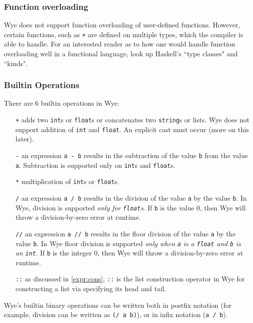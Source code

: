 \documentclass[a4paper, 12pt]{article}
\begin{document}
\subsubsection{Function overloading}
Wye does not support function overloading of user-defined functions. However, certain functions, such as \texttt{+} are defined on multiple types, which the compiler is able to handle. For an interested reader as to how one would handle function overloading well in a functional language, look up Haskell's ``type classes" and ``kinds".

\subsubsection{Builtin Operations}
There are 6 builtin operations in Wye:
\begin{itemize}
\item[\texttt{+}] adds two \texttt{int}s or \texttt{float}s or concatenates two \texttt{string}s or lists. Wye does not support addition of \texttt{int} and \texttt{float}. An explicit cast must occur (more on this later).
\item[\texttt{-}] an expression \texttt{a - b} results in the subtraction of the value \texttt{b} from the value \texttt{a}. Subtraction is supported only on \texttt{int}s and \texttt{float}s.
\item[\texttt{*}] multiplication of \texttt{int}s or \texttt{float}s.
\item[\texttt{/}] an expression \texttt{a / b} results in the division of the value \texttt{a} by the value \texttt{b}. In Wye, division is supported \textit{only for \texttt{float}s}. If \texttt{b} is the value 0, then Wye will throw a division-by-zero error at runtime.
\item[\texttt{//}] an expression \texttt{a // b} results in the floor division of the value \texttt{a} by the value \texttt{b}. In Wye floor division is supported \textit{only when \texttt{a} is a \texttt{float} and \texttt{b} is an \texttt{int}}. If \texttt{b} is the integer 0, then Wye will throw a division-by-zero error at runtime.
\item[\texttt{::}] as discussed in \ref{expr:cons}, \texttt{::} is the list construction operator in Wye for constructing a list via specifying its head and tail.
\end{itemize}

Wye's builtin binary operations can be written both in postfix notation (for example, division can be written as \texttt{(/ a b)}), or in infix notation (\texttt{a / b}).
\end{document}
